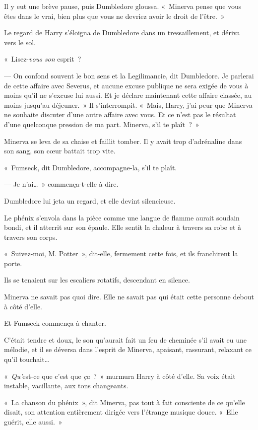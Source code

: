 Il y eut une brève pause, puis Dumbledore gloussa. «~Minerva pense que vous êtes dans le vrai, bien plus que vous ne devriez avoir le droit de l'être.~»

Le regard de Harry s'éloigna de Dumbledore dans un tressaillement, et dériva vers le sol.

«~Lisez-\emph{vous son} esprit~?

--- On confond souvent le bon sens et la Legilimancie, dit Dumbledore. Je parlerai de cette affaire avec Severus, et aucune excuse publique ne sera exigée de vous à moins qu'il ne s'excuse lui aussi. Et je déclare maintenant cette affaire classée, au moins jusqu'au déjeuner.~» Il s'interrompit. «~Mais, Harry, j'ai peur que Minerva ne souhaite discuter d'une autre affaire avec vous. Et ce n'est pas le résultat d'une quelconque pression de ma part. Minerva, s'il te plaît~?~»

Minerva se leva de sa chaise et faillit tomber. Il y avait trop d'adrénaline dans son sang, son cœur battait trop vite.

«~Fumseck, dit Dumbledore, accompagne-la, s'il te plaît.

--- Je n'ai…~» commença-t-elle à dire.

Dumbledore lui jeta un regard, et elle devint silencieuse.

Le phénix s'envola dans la pièce comme une langue de flamme aurait soudain bondi, et il atterrit sur son épaule. Elle sentit la chaleur à travers sa robe et à travers son corps.

«~Suivez-moi, M. Potter~», dit-elle, fermement cette fois, et ils franchirent la porte.

\later

Ils se tenaient sur les escaliers rotatifs, descendant en silence.

Minerva ne savait pas quoi dire. Elle ne savait pas qui était cette personne debout à côté d'elle.

Et Fumseck commença à chanter.

C'était tendre et doux, le son qu'aurait fait un feu de cheminée s'il avait eu une mélodie, et il se déversa dans l'esprit de Minerva, apaisant, rassurant, relaxant ce qu'il touchait…

«~\emph{Qu'}est-ce que c'est que \emph{ça}~?~» murmura Harry à côté d'elle. Sa voix était instable, vacillante, aux tons changeants.

«~La chanson du phénix~», dit Minerva, pas tout à fait consciente de ce qu'elle disait, son attention entièrement dirigée vers l'étrange musique douce. «~Elle guérit, elle aussi.~»

